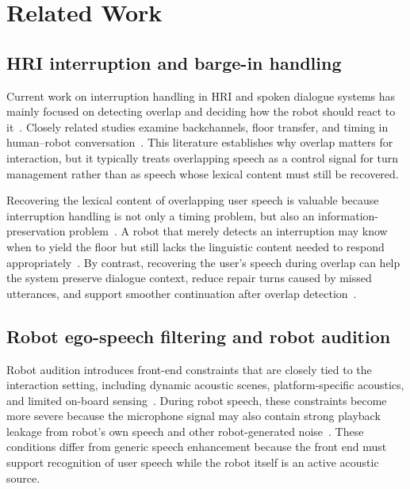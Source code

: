\documentclass[manuscript,screen,review]{acmart}
\begin{document}
\section{Related Work}

\subsection{HRI interruption and barge-in handling}
Current work on interruption handling in HRI and spoken dialogue systems has mainly focused on detecting overlap and deciding how the robot should react to it~\cite{gervits2018pardon,bekal22_interspeech,selfridge2013continuously,cao2025interruption}. Closely related studies examine backchannels, floor transfer, and timing in human--robot conversation~\cite{skantze2021turn,inoue2025yeah}. This literature establishes why overlap matters for interaction, but it typically treats overlapping speech as a control signal for turn management rather than as speech whose lexical content must still be recovered.

Recovering the lexical content of overlapping user speech is valuable because interruption handling is not only a timing problem, but also an information-preservation problem~\cite{selfridge2013continuously}. A robot that merely detects an interruption may know when to yield the floor but still lacks the linguistic content needed to respond appropriately~\cite{gervits2018pardon}. By contrast, recovering the user's speech during overlap can help the system preserve dialogue context, reduce repair turns caused by missed utterances, and support smoother continuation after overlap detection~\cite{skantze2021turn}. 

\subsection{Robot ego-speech filtering and robot audition}
Robot audition introduces front-end constraints that are closely tied to the interaction setting, including dynamic acoustic scenes, platform-specific acoustics, and limited on-board sensing~\cite{nakadai2012robot}. During robot speech, these constraints become more severe because the microphone signal may also contain strong playback leakage from robot's own speech and other robot-generated noise~\cite{li2024near}. These conditions differ from generic speech enhancement because the front end must support recognition of user speech while the robot itself is an active acoustic source.
\end{document}
